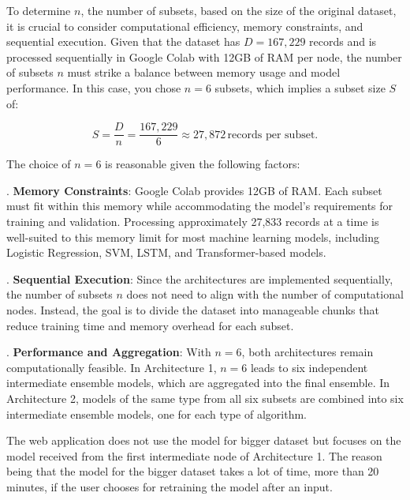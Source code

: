 \pagebreak

\noindent
To determine \( n \), the number of subsets, based on the size of the original dataset, it is crucial to consider computational efficiency, memory constraints, and sequential execution. Given that the dataset has \( D = 167,229 \) records and is processed sequentially in Google Colab with 12GB of RAM per node, the number of subsets \( n \) must strike a balance between memory usage and model performance. In this case, you chose \( n = 6 \) subsets, which implies a subset size \( S \) of:

\[
S = \frac{D}{n} = \frac{167,229}{6} \approx 27,872 \, \text{records per subset}.
\]

\vspace{1em}

\noindent
The choice of \( n = 6 \) is reasonable given the following factors:

\vspace{1em}

. \textbf{Memory Constraints}: Google Colab provides 12GB of RAM. Each subset must fit within this memory while accommodating the model's requirements for training and validation. Processing approximately 27,833 records at a time is well-suited to this memory limit for most machine learning models, including Logistic Regression, SVM, LSTM, and Transformer-based models.

. \textbf{Sequential Execution}: Since the architectures are implemented sequentially, the number of subsets \( n \) does not need to align with the number of computational nodes. Instead, the goal is to divide the dataset into manageable chunks that reduce training time and memory overhead for each subset.

. \textbf{Performance and Aggregation}: With \( n = 6 \), both architectures remain computationally feasible. In Architecture 1, \( n = 6 \) leads to six independent intermediate ensemble models, which are aggregated into the final ensemble. In Architecture 2, models of the same type from all six subsets are combined into six intermediate ensemble models, one for each type of algorithm.

\vspace{1em}

\noindent
The web application does not use the model for bigger dataset but focuses on the model received from the first intermediate node of Architecture 1. The reason being that the model for the bigger dataset takes a lot of time, more than 20 minutes, if the user chooses for retraining the model after an input.

\pagebreak

